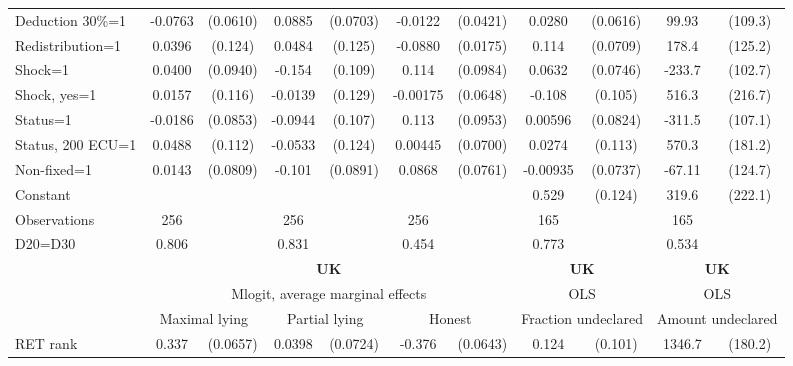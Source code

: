 \begin{tabular}{l|cccccc|cc|cc}
Deduction 30\%=1&  -0.0763         & (0.0610)&   0.0885         & (0.0703)&  -0.0122         & (0.0421)&   0.0280         & (0.0616)&    99.93         &  (109.3)\\
Redistribution=1&   0.0396         &  (0.124)&   0.0484         &  (0.125)&  -0.0880\sym{***}& (0.0175)&    0.114         & (0.0709)&    178.4         &  (125.2)\\
Shock=1         &   0.0400         & (0.0940)&   -0.154         &  (0.109)&    0.114         & (0.0984)&   0.0632         & (0.0746)&   -233.7\sym{**} &  (102.7)\\
Shock, yes=1    &   0.0157         &  (0.116)&  -0.0139         &  (0.129)& -0.00175         & (0.0648)&   -0.108         &  (0.105)&    516.3\sym{**} &  (216.7)\\
Status=1        &  -0.0186         & (0.0853)&  -0.0944         &  (0.107)&    0.113         & (0.0953)&  0.00596         & (0.0824)&   -311.5\sym{***}&  (107.1)\\
Status, 200 ECU=1&   0.0488         &  (0.112)&  -0.0533         &  (0.124)&  0.00445         & (0.0700)&   0.0274         &  (0.113)&    570.3\sym{***}&  (181.2)\\
Non-fixed=1     &   0.0143         & (0.0809)&   -0.101         & (0.0891)&   0.0868         & (0.0761)& -0.00935         & (0.0737)&   -67.11         &  (124.7)\\
Constant        &                  &         &                  &         &                  &         &    0.529\sym{***}&  (0.124)&    319.6         &  (222.1)\\
\hline
Observations    &      256         &         &      256         &         &      256         &         &      165         &         &      165         &         \\
D20=D30         &    0.806         &         &    0.831         &         &    0.454         &         &    0.773         &         &    0.534         &         \\
\hline\hline
&\multicolumn{6}{c|}{\bf UK}&\multicolumn{2}{c|}{\bf UK}&\multicolumn{2}{c}{\bf UK}\\ &\multicolumn{6}{c|}{Mlogit, average marginal effects }&\multicolumn{2}{c|}{OLS}&\multicolumn{2}{c}{OLS}\\
                &\multicolumn{2}{c}{Maximal lying}&\multicolumn{2}{c}{Partial lying}&\multicolumn{2}{c}{Honest}  &\multicolumn{2}{c}{Fraction undeclared}&\multicolumn{2}{c}{Amount undeclared}\\
\hline
RET rank        &    0.337\sym{***}& (0.0657)&   0.0398         & (0.0724)&   -0.376\sym{***}& (0.0643)&    0.124         &  (0.101)&   1346.7\sym{***}&  (180.2)\\

\end{tabular}
